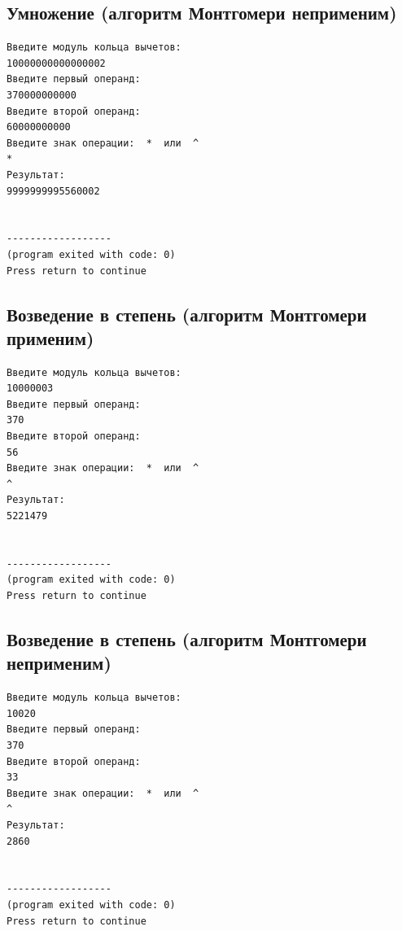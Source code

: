\documentclass[a4paper,12pt]{article} %
\begin{document}
\subsection*{Умножение (алгоритм Монтгомери неприменим)}
\begin{verbatim}
Введите модуль кольца вычетов:
10000000000000002
Введите первый операнд:
370000000000
Введитe второй операнд:
60000000000
Введите знак операции:  *  или  ^
*
Результат:
9999999995560002


------------------
(program exited with code: 0)
Press return to continue
\end{verbatim}

\subsection*{Возведение в степень (алгоритм Монтгомери применим)}
\begin{verbatim}
Введите модуль кольца вычетов:
10000003
Введите первый операнд:
370
Введитe второй операнд:
56
Введите знак операции:  *  или  ^
^
Результат:
5221479


------------------
(program exited with code: 0)
Press return to continue
\end{verbatim}

\subsection*{Возведение в степень (алгоритм Монтгомери неприменим)}
\begin{verbatim}
Введите модуль кольца вычетов:
10020
Введите первый операнд:
370
Введитe второй операнд:
33
Введите знак операции:  *  или  ^
^
Результат:
2860


------------------
(program exited with code: 0)
Press return to continue
\end{verbatim}


\printbibliography
\end{document}
